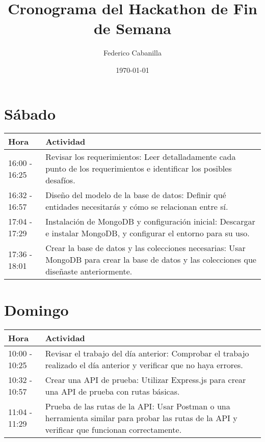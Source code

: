\documentclass[a4paper]{article}
\title{Cronograma del Hackathon de Fin de Semana}
\author{Federico Cabanilla}
\date{\today}
\begin{document}
\maketitle

\section{Sábado}

\begin{table}[]
\begin{tabularx}{\textwidth}{|l|X|}
\hline
\rowcolor[HTML]{BBDEFB} 
\textbf{Hora} & \textbf{Actividad} \\ \hline
16:00 - 16:25 & Revisar los requerimientos: Leer detalladamente cada punto de los requerimientos e identificar los posibles desafíos. \\ \hline
16:32 - 16:57 & Diseño del modelo de la base de datos: Definir qué entidades necesitarás y cómo se relacionan entre sí. \\ \hline
17:04 - 17:29 & Instalación de MongoDB y configuración inicial: Descargar e instalar MongoDB, y configurar el entorno para su uso. \\ \hline
17:36 - 18:01 & Crear la base de datos y las colecciones necesarias: Usar MongoDB para crear la base de datos y las colecciones que diseñaste anteriormente. \\ \hline
\end{tabularx}
\end{table}

\section{Domingo}

\begin{table}[]
\begin{tabularx}{\textwidth}{|l|X|}
\hline
\rowcolor[HTML]{BBDEFB} 
\textbf{Hora} & \textbf{Actividad} \\ \hline
10:00 - 10:25 & Revisar el trabajo del día anterior: Comprobar el trabajo realizado el día anterior y verificar que no haya errores. \\ \hline
10:32 - 10:57 & Crear una API de prueba: Utilizar Express.js para crear una API de prueba con rutas básicas. \\ \hline
11:04 - 11:29 & Prueba de las rutas de la API: Usar Postman o una herramienta similar para probar las rutas de la API y verificar que funcionan correctamente. \\ \hline
\end{tabularx}
\end{table}
\end{document}
